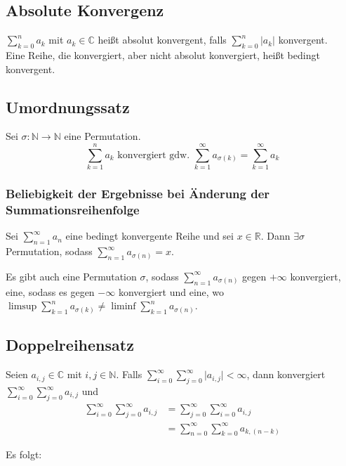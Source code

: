 \documentclass[halfparscip]{scrartcl}
\newcounter{subsection2}
\begin{document}
\subsection{Absolute Konvergenz}
$\sum\limits_{k=0}^na_k$ mit $a_k \in \mathbb{C}$ heißt absolut konvergent, falls $\sum\limits_{k=0}^n\vert a_k\vert$ konvergent.\\
Eine Reihe, die konvergiert, aber nicht absolut konvergiert, heißt bedingt konvergent.

\subsection{Umordnungssatz}
Sei $\sigma: \mathbb{N} \rightarrow \mathbb{N}$ eine Permutation.
\begin{equation*}
	\sum_{k=1}^na_k \text{ konvergiert gdw. } \sum_{k=1}^\infty a_{\sigma(k)} = \sum_{k=1}^\infty a_k
\end{equation*}

\subsubsection*{Beliebigkeit der Ergebnisse bei Änderung der Summationsreihenfolge}
Sei $\sum\limits_{n=1}^{\infty}a_n$ eine bedingt konvergente Reihe und sei $x \in \mathbb{R}$. Dann $\exists \sigma$ Permutation, sodass $\sum\limits_{n=1}^{\infty}a_{\sigma(n)} = x$.

\noindent Es gibt auch eine Permutation $\sigma$, sodass $\sum\limits_{n=1}^{\infty}a_{\sigma(n)}$ gegen $+\infty$ konvergiert, eine, sodass es gegen $-\infty$ konvergiert und eine, wo $\limsup \sum\limits_{k=1}^{n}a_{\sigma(k)} \neq \liminf \sum\limits_{k=1}^{n}a_{\sigma(n)}$.

\subsection{Doppelreihensatz}
Seien $a_{i,j} \in \mathbb{C}$ mit $i,j \in \mathbb{N}$. Falls $\sum\limits_{i=0}^{\infty}\sum\limits_{j=0}^\infty\vert a_{i,j}\vert < \infty$, dann konvergiert $\sum\limits_{i=0}^{\infty}\sum\limits_{j=0}^\infty a_{i,j}$ und
\begin{align*}
\sum\limits_{i=0}^{\infty}\sum\limits_{j=0}^\infty a_{i,j} &= \sum\limits_{j=0}^{\infty}\sum\limits_{i=0}^\infty a_{i,j} \\
&= \sum\limits_{n=0}^{\infty}\sum\limits_{k=0}^\infty a_{k,(n-k)}
\end{align*}

\noindent Es folgt:
\end{document}
